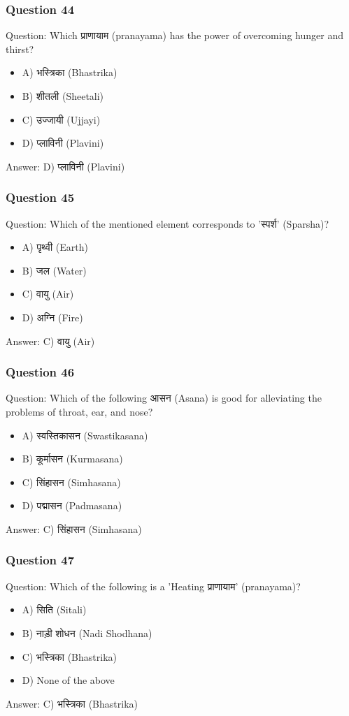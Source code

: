 \begin{frame}[fragile]\frametitle{Question 44}
Question: Which प्राणायाम (pranayama) has the power of overcoming hunger and thirst?
\begin{itemize}
\item A) भस्त्रिका (Bhastrika)
\item B) शीतली (Sheetali)
\item C) उज्जायी (Ujjayi)
\item D) प्लाविनी (Plavini)
\end{itemize}
Answer: D) प्लाविनी (Plavini)
\end{frame}

\begin{frame}[fragile]\frametitle{Question 45}
Question: Which of the mentioned element corresponds to 'स्पर्श' (Sparsha)?
\begin{itemize}
\item A) पृथ्वी (Earth)
\item B) जल (Water)
\item C) वायु (Air)
\item D) अग्नि (Fire)
\end{itemize}
Answer: C) वायु (Air)
\end{frame}

\begin{frame}[fragile]\frametitle{Question 46}
Question: Which of the following आसन (Asana) is good for alleviating the problems of throat, ear, and nose?
\begin{itemize}
\item A) स्वस्तिकासन (Swastikasana)
\item B) कूर्मासन (Kurmasana)
\item C) सिंहासन (Simhasana)
\item D) पद्मासन (Padmasana)
\end{itemize}
Answer: C) सिंहासन (Simhasana)
\end{frame}

\begin{frame}[fragile]\frametitle{Question 47}
Question: Which of the following is a 'Heating प्राणायाम' (pranayama)?
\begin{itemize}
\item A) सिति (Sitali)
\item B) नाड़ी शोधन (Nadi Shodhana)
\item C) भस्त्रिका (Bhastrika)
\item D) None of the above
\end{itemize}
Answer: C) भस्त्रिका (Bhastrika)
\end{frame}


